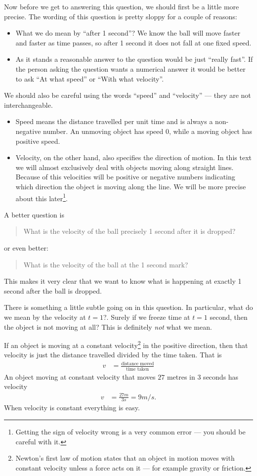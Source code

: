 Now before we get to answering this question, we should first be a little more
precise. The wording of this question is pretty sloppy for a couple of reasons:
\begin{itemize}
 \item What we do mean by  ``after 1 second''? We know the ball
will move faster and faster as time passes, so after 1 second it does not fall
at one fixed speed.
 \item As it stands a reasonable answer to the question would be just ``really
fast''. If the person asking the question wants a numerical answer it
would be better to ask ``At what speed'' or ``With what velocity''.
\end{itemize}
We should also be careful using the words ``speed'' and ``velocity'' --- they
are not interchangeable.
\begin{itemize}
 \item Speed means the distance travelled per unit time and is always a
non-negative number. An unmoving object has speed $0$, while a moving object has
positive speed.
 \item Velocity, on the other hand, also specifies the direction of motion.
In this text we will almost exclusively deal with objects moving along
straight lines. Because of this velocities will be positive or negative
numbers indicating  which direction the object is moving along the line. We
will be more precise about this later\footnote{Getting the sign of velocity
wrong is a very common error --- you should be careful with it.}.
\end{itemize}
A better question is
\begin{quote}
 What is the velocity of the ball precisely 1 second after it is dropped?
\end{quote}
or even better:
\begin{quote}
 What is the velocity of the ball at the 1 second mark?
\end{quote}
This makes it very clear that we want to know what is happening at exactly 1
second after the ball is dropped.

There is something a little subtle going on in this question. In particular,
what do we mean by the velocity at $t=1$?. Surely if we freeze time at $t=1$
second, then the object is not moving at all? This is definitely \emph{not}
what we mean.

If an object is moving at a constant velocity\footnote{Newton's first law of
motion states that an object in motion moves with constant velocity unless a
force acts on it --- for example gravity or friction.} in the positive
direction, then that velocity is just the distance travelled divided by the time
taken. That is
\begin{align*}
  v &= \frac{\text{distance moved}}{\text{time taken}}
\end{align*}
An object moving at constant velocity that moves $27$ metres in $3$ seconds has
velocity
\begin{align*}
  v &= \frac{27 m}{3 s} = 9 m/s.
\end{align*}
When velocity is constant everything is easy.

